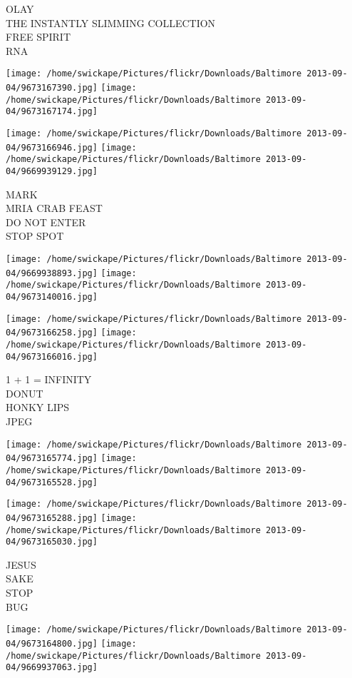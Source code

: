 \documentclass[10pt,letterpaper]{article}
\begin{document}
OLAY\\
THE INSTANTLY SLIMMING COLLECTION\\
FREE SPIRIT\\
RNA
\pagebreak

\texttt{[image: /home/swickape/Pictures/flickr/Downloads/Baltimore 2013-09-04/9673167390.jpg]}
\texttt{[image: /home/swickape/Pictures/flickr/Downloads/Baltimore 2013-09-04/9673167174.jpg]}

\texttt{[image: /home/swickape/Pictures/flickr/Downloads/Baltimore 2013-09-04/9673166946.jpg]}
\texttt{[image: /home/swickape/Pictures/flickr/Downloads/Baltimore 2013-09-04/9669939129.jpg]}

MARK\\
MRIA CRAB FEAST\\
DO NOT ENTER\\
STOP SPOT
\pagebreak

\texttt{[image: /home/swickape/Pictures/flickr/Downloads/Baltimore 2013-09-04/9669938893.jpg]}
\texttt{[image: /home/swickape/Pictures/flickr/Downloads/Baltimore 2013-09-04/9673140016.jpg]}

\texttt{[image: /home/swickape/Pictures/flickr/Downloads/Baltimore 2013-09-04/9673166258.jpg]}
\texttt{[image: /home/swickape/Pictures/flickr/Downloads/Baltimore 2013-09-04/9673166016.jpg]}

1 + 1 = INFINITY\\
DONUT\\
HONKY LIPS\\
JPEG
\pagebreak

\texttt{[image: /home/swickape/Pictures/flickr/Downloads/Baltimore 2013-09-04/9673165774.jpg]}
\texttt{[image: /home/swickape/Pictures/flickr/Downloads/Baltimore 2013-09-04/9673165528.jpg]}

\texttt{[image: /home/swickape/Pictures/flickr/Downloads/Baltimore 2013-09-04/9673165288.jpg]}
\texttt{[image: /home/swickape/Pictures/flickr/Downloads/Baltimore 2013-09-04/9673165030.jpg]}

JESUS\\
SAKE\\
STOP\\
BUG
\pagebreak

\texttt{[image: /home/swickape/Pictures/flickr/Downloads/Baltimore 2013-09-04/9673164800.jpg]}
\texttt{[image: /home/swickape/Pictures/flickr/Downloads/Baltimore 2013-09-04/9669937063.jpg]}
\end{document}
